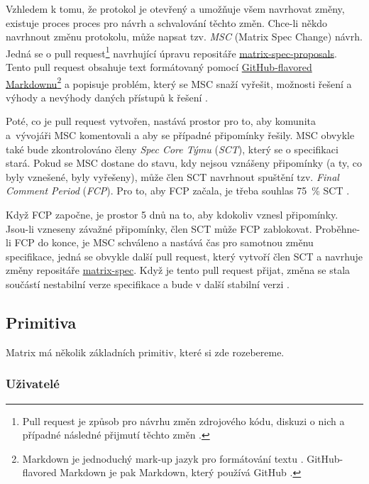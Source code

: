 Vzhledem k tomu, že protokol je otevřený a umožňuje všem navrhovat změny,
existuje proces proces pro návrh a schvalování těchto změn. Chce-li někdo
navrhnout změnu protokolu, může napsat tzv. \textit{MSC} (Matrix Spec Change)
návrh. Jedná se o pull request\footnote{
    Pull request je způsob pro návrhu změn
    zdrojového kódu, diskuzi o nich a případné následné přijmutí těchto změn
    \cite{GitHub-PullRequests}.
}
navrhující úpravu repositáře
\href{https://github.com/matrix-org/matrix-spec-proposals}{matrix-spec-proposals}.
Tento pull request obsahuje text formátovaný pomocí
\href{https://docs.github.com/en/get-started/writing-on-github/getting-started-with-writing-and-formatting-on-github/basic-writing-and-formatting-syntax}{GitHub-flavored Markdownu}\footnote{
    Markdown je jednoduchý mark-up jazyk pro formátování textu
    \cite{JohnGruber-Markdown}. GitHub-flavored Markdown je pak Markdown, který
    používá GitHub \cite{GitHub-Markdown}.
} a popisuje problém, který se MSC snaží vyřešit, možnosti řešení a výhody a
nevýhody daných přístupů k řešení \cite{MatrixORG-MSCs}.

Poté, co je pull request vytvořen, nastává prostor pro to, aby komunita
a~vývojáři MSC komentovali a aby se případné připomínky řešily. MSC obvykle také
bude zkontrolováno členy \textit{Spec Core Týmu} (\textit{SCT}), který se o
specifikaci stará. Pokud se MSC dostane do stavu, kdy nejsou vznášeny připomínky
(a ty, co byly vznešené, byly vyřešeny), může člen SCT navrhnout spuštění tzv.
\textit{Final Comment Period} (\textit{FCP}). Pro to, aby FCP začala, je třeba
souhlas 75~\% SCT \cite{MatrixORG-MSCs}.

Když FCP započne, je prostor 5 dnů na to, aby kdokoliv vznesl připomínky.
Jsou-li vzneseny závažné připomínky, člen SCT může FCP zablokovat. Proběhne-li
FCP do konce, je MSC schváleno a nastává čas pro samotnou změnu specifikace,
jedná se obvykle další pull request, který vytvoří člen SCT a navrhuje změny
repositáře \href{https://github.com/matrix-org/matrix-spec}{matrix-spec}. Když
je tento pull request přijat, změna se stala součástí nestabilní verze
specifikace a bude v další stabilní verzi \cite{MatrixORG-MSCs}.

\subsection{Primitiva}

Matrix má několik základních primitiv, které si zde rozebereme.

\subsubsection{Uživatelé}

